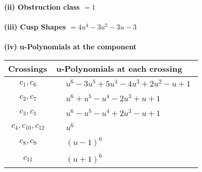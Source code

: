 \documentclass[1p]{elsarticle_modified}
\theoremstyle{definition}
\begin{document}
\flushleft \textbf{(ii) Obstruction class $= 1$}\\~\\
\flushleft \textbf{(iii) Cusp Shapes $= 4 u^4-3 u^2-3 u-3$}\\~\\
\newpage\renewcommand{\arraystretch}{1}
\flushleft \textbf{(iv) u-Polynomials at the component}\newline \\
\begin{tabular}{m{50pt}|m{274pt}}
Crossings & \hspace{64pt}u-Polynomials at each crossing \\
\hline $$\begin{aligned}c_{1},c_{6}\end{aligned}$$&$\begin{aligned}
&u^6-3 u^5+5 u^4-4 u^3+2 u^2- u+1
\end{aligned}$\\
\hline $$\begin{aligned}c_{2},c_{7}\end{aligned}$$&$\begin{aligned}
&u^6+u^5- u^4-2 u^3+u+1
\end{aligned}$\\
\hline $$\begin{aligned}c_{3},c_{5}\end{aligned}$$&$\begin{aligned}
&u^6- u^5- u^4+2 u^3- u+1
\end{aligned}$\\
\hline $$\begin{aligned}c_{4},c_{10},c_{12}\end{aligned}$$&$\begin{aligned}
&u^6
\end{aligned}$\\
\hline $$\begin{aligned}c_{8},c_{9}\end{aligned}$$&$\begin{aligned}
&(u-1)^6
\end{aligned}$\\
\hline $$\begin{aligned}c_{11}\end{aligned}$$&$\begin{aligned}
&(u+1)^6
\end{aligned}$\\
\hline
\end{tabular}\\~\\
\end{document}
